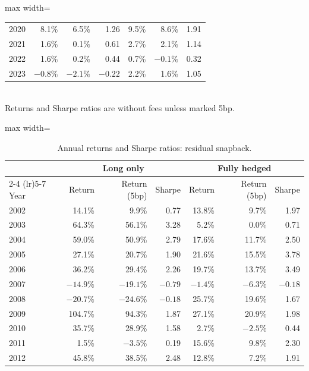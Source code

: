 \documentclass[11pt,letterpaper]{article}
\begin{document}
\begin{table}[!htbp]
\begin{adjustbox}{max width=\linewidth}
\begin{tabular}{lrrrrrr}
            2020 & 8.1\% & 6.5\% & 1.26 & 9.5\% & 8.6\% & 1.91 \\
            2021 & 1.6\% & 0.1\% & 0.61 & 2.7\% & 2.1\% & 1.14 \\
            2022 & 1.6\% & 0.2\% & 0.44 & 0.7\% & $-0.1\%$ & 0.32 \\
            2023 & $-0.8\%$ & $-2.1\%$ & $-0.22$ & 2.2\% & 1.6\% & 1.05 \\
            \bottomrule
        \end{tabular}
    \end{adjustbox}
    \\[4pt]
    \small Returns and Sharpe ratios are without fees unless marked 5bp.
\end{table}

\begin{table}[!htbp]
    \centering
    \caption{Annual returns and Sharpe ratios: residual snapback.}
    \label{tab:yearly-snap}
    \begin{adjustbox}{max width=\linewidth}
        \begin{tabular}{lrrrrrr}
            \toprule
            & \multicolumn{3}{c}{Long only} & \multicolumn{3}{c}{Fully hedged} \\
            \cmidrule(lr){2-4} \cmidrule(lr){5-7}
            Year & Return & Return (5bp) & Sharpe & Return & Return (5bp) & Sharpe \\
            \midrule
            2002 & 14.1\% & 9.9\% & 0.77 & 13.8\% & 9.7\% & 1.97 \\
            2003 & 64.3\% & 56.1\% & 3.28 & 5.2\% & 0.0\% & 0.71 \\
            2004 & 59.0\% & 50.9\% & 2.79 & 17.6\% & 11.7\% & 2.50 \\
            2005 & 27.1\% & 20.7\% & 1.90 & 21.6\% & 15.5\% & 3.78 \\
            2006 & 36.2\% & 29.4\% & 2.26 & 19.7\% & 13.7\% & 3.49 \\
            2007 & $-14.9\%$ & $-19.1\%$ & $-0.79$ & $-1.4\%$ & $-6.3\%$ & $-0.18$ \\
            2008 & $-20.7\%$ & $-24.6\%$ & $-0.18$ & 25.7\% & 19.6\% & 1.67 \\
            2009 & 104.7\% & 94.3\% & 1.87 & 27.1\% & 20.9\% & 1.98 \\
            2010 & 35.7\% & 28.9\% & 1.58 & 2.7\% & $-2.5\%$ & 0.44 \\
            2011 & 1.5\% & $-3.5\%$ & 0.19 & 15.6\% & 9.8\% & 2.30 \\
            2012 & 45.8\% & 38.5\% & 2.48 & 12.8\% & 7.2\% & 1.91 \\

\end{tabular}
\end{adjustbox}
\end{table}
\end{document}
